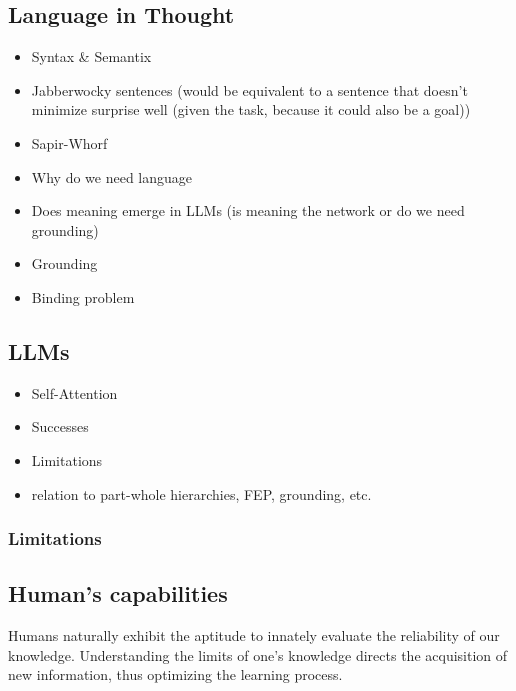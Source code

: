 \subsection{Language in Thought}
\begin{itemize}
    \item Syntax \& Semantix
    \item Jabberwocky sentences (would be equivalent to a sentence that doesn't minimize surprise well (given the task, because it could also be a goal))
\end{itemize}

\begin{itemize}
    \item Sapir-Whorf
    \item Why do we need language
    \item Does meaning emerge in LLMs (is meaning the network or do we need grounding)
    \item Grounding
    \item Binding problem
\end{itemize}

\subsection{LLMs}
\begin{itemize}
    \item Self-Attention
    \item Successes
    \item Limitations
    \item relation to part-whole hierarchies, FEP, grounding, etc. 
\end{itemize}

\subsubsection{Limitations}

\subsection{Human's capabilities}
Humans naturally exhibit the aptitude to innately evaluate the reliability of our knowledge. Understanding the limits of one's knowledge directs the acquisition of new information, thus optimizing the learning process.

